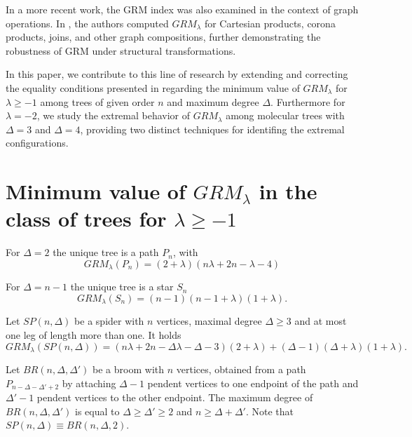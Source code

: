 \documentclass[preprint,12pt]{elsarticle}
\begin{document}
In a more recent work, the GRM index was also examined in the context of graph operations. In \cite{khoeilar2021}, the authors computed $GRM_\lambda$ for Cartesian products, corona products, joins, and other graph compositions, further demonstrating the robustness of GRM under structural transformations.


In this paper, we contribute to this line of research by extending and correcting the equality conditions presented in \cite{dehgardia2023} regarding the minimum value of $GRM_\lambda$ for $\lambda \geq -1$ among trees of given order $n$ and maximum degree $\Delta$. Furthermore for $\lambda = -2$, we study the extremal behavior of $GRM_\lambda$ among molecular trees with $\Delta = 3$ and $\Delta = 4$, providing two distinct techniques for identifing the extremal configurations.




\section{Minimum value of $GRM_{\lambda}$ in the class of trees for $\lambda\geq -1$}

For $\Delta = 2$ the unique tree is a path $P_n$, with 
$$
GRM_{\lambda} (P_n) = (2+\lambda)(n \lambda + 2n -\lambda - 4)
$$

For $\Delta = n - 1$ the unique tree is a star $S_n$ 
$$
GRM_{\lambda} (S_n) = (n - 1) (n - 1 + \lambda) (1 + \lambda).
$$

Let $SP(n, \Delta)$ be a spider with $n$ vertices, maximal degree $\Delta \geq 3$ and at most one leg of length more than one. It holds
$$
GRM_{\lambda} (SP(n, \Delta)) = 
(n \lambda + 2 n - \Delta \lambda - \Delta - 3)(2 + \lambda) + (\Delta - 1)(\Delta + \lambda)(1 + \lambda).
$$

Let $BR(n, \Delta, \Delta')$ be a broom with $n$ vertices, obtained from a path $P_{n - \Delta - \Delta' + 2}$ by attaching $\Delta - 1$ pendent vertices to one endpoint of the path and $\Delta' - 1$ pendent vertices to the other endpoint. The maximum degree of $BR(n, \Delta, \Delta')$ is equal to $\Delta \geq \Delta' \geq 2$ and $n \geq \Delta + \Delta'$. Note that $SP(n, \Delta) \equiv BR (n, \Delta, 2)$.
\end{document}
